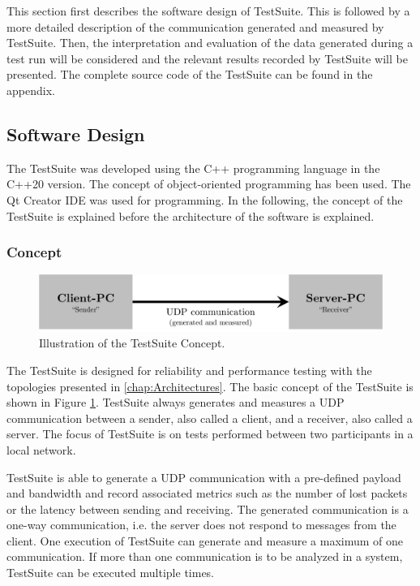 This section first describes the software design of TestSuite. This is followed by a more detailed description of the communication generated and measured by TestSuite. Then, the interpretation and evaluation of the data generated during a test run will be considered and the relevant results recorded by TestSuite will be presented. The complete source code of the TestSuite can be found in the appendix.


\subsection{Software Design}
The TestSuite was developed using the C++ programming language in the C++20 version. The concept of object-oriented programming has been used. The Qt Creator IDE was used for programming. In the following, the concept of the TestSuite is explained before the architecture of the software is explained.

\subsubsection{Concept}

\begin{figure}[h!]
    \centering
    \includegraphics[width=1\linewidth]{figures/method/swdesign1.pdf}
    \caption[Illustration of the TestSuite Concept]{Illustration of the TestSuite Concept.}
    \label{fig:tsconcept}
\end{figure}

The TestSuite is designed for reliability and performance testing with the topologies presented in \ref{chap:Architectures}. The basic concept of the TestSuite is shown in Figure \ref{fig:tsconcept}. TestSuite always generates and measures a UDP communication between a sender, also called a client, and a receiver, also called a server. The focus of TestSuite is on tests performed between two participants in a local network.

TestSuite is able to generate a UDP communication with a pre-defined payload and bandwidth and record associated metrics such as the number of lost packets or the latency between sending and receiving. The generated communication is a one-way communication, i.e. the server does not respond to messages from the client. One execution of TestSuite can generate and measure a maximum of one communication. If more than one communication is to be analyzed in a system, TestSuite can be executed multiple times.

